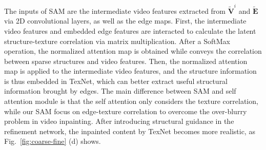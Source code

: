 The inputs of SAM are the intermediate video features extracted from $\boldsymbol{\widetilde{V}}^i$ and $\boldsymbol{\widetilde{E}}$ via 2D convolutional layers, as well as
the edge maps. %
First, the intermediate video features and embedded edge features are interacted to calculate the latent structure-texture correlation via matrix multiplication. 
After a SoftMax operation, the normalized attention map is obtained while conveys the correlation between sparse structures and video features.
%
Then, the normalized attention map is applied to the intermediate video features, and the structure information is thus embedded in TexNet, which can better extract useful structural information brought by edges.
{\color{blue}
The main difference between SAM and self attention module \cite{vaswani2017attention} is that the self attention only considers the texture correlation, while our SAM focus on edge-texture correlation to overcome the over-blurry problem in video inpainting.
}
After introducing structural guidance in the refinement network, the inpainted content by TexNet becomes more realistic, as Fig.~\ref{fig:coarse-fine} (d) shows.



